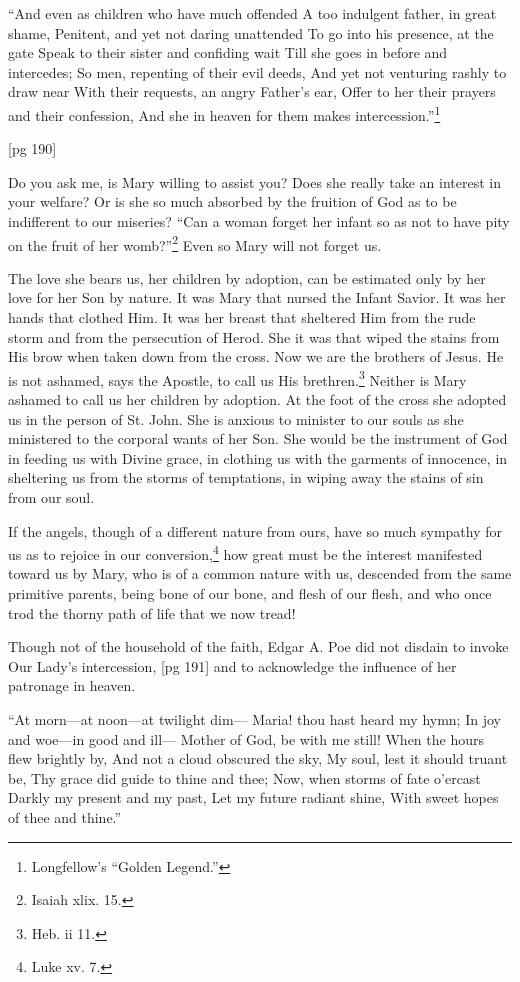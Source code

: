 “And even as children who have much offended
A too indulgent father, in great shame,
Penitent, and yet not daring unattended
To go into his presence, at the gate
Speak to their sister and confiding wait
Till she goes in before and intercedes;
So men, repenting of their evil deeds,
And yet not venturing rashly to draw near
With their requests, an angry Father's ear,
Offer to her their prayers and their confession,
And she in heaven for them makes
intercession.”\footnote{Longfellow's “Golden Legend.”}

[pg 190]

Do you ask me, is Mary willing to assist you?
Does she really take an interest in your welfare?
Or is she so much absorbed by the fruition of God
as to be indifferent to our miseries? “Can a woman
forget her infant so as not to have pity on the fruit
of her womb?”\footnote{Isaiah xlix.
15.} Even so Mary will not forget us.

The love she bears us, her children by adoption,
can be estimated only by her love for her
Son by nature. It was Mary that nursed the Infant
Savior. It was her hands that clothed Him.
It was her breast that sheltered Him from the
rude storm and from the persecution of Herod.
She it was that wiped the stains from His brow
when taken down from the cross. Now we are the
brothers of Jesus. He is not ashamed, says the
Apostle, to call us His brethren.\footnote{Heb.
ii 11.} Neither is Mary
ashamed to call us her children by adoption. At
the foot of the cross she adopted us in the person
of St. John. She is anxious to minister to
our souls as she ministered to the corporal wants
of her Son. She would be the instrument of God
in feeding us with Divine grace, in clothing us
with the garments of innocence, in sheltering us
from the storms of temptations, in wiping away
the stains of sin from our soul.

If the angels, though of a different nature from
ours, have so much sympathy for us as to rejoice
in our conversion,\footnote{Luke xv.
7.} how great must be the interest
manifested toward us by Mary, who is of a
common nature with us, descended from the same
primitive parents, being bone of our bone, and
flesh of our flesh, and who once trod the thorny
path of life that we now tread!

Though not of the household of the faith, Edgar
A. Poe did not disdain to invoke Our Lady's intercession,
[pg 191]
and to acknowledge the influence of
her patronage in heaven.

“At morn—at noon—at twilight dim—
Maria! thou hast heard my hymn;
In joy and woe—in good and ill—
Mother of God, be with me still!
When the hours flew brightly by,
And not a cloud obscured the sky,
My soul, lest it should truant be,
Thy grace did guide to thine and thee;
Now, when storms of fate o'ercast
Darkly my present and my past,
Let my future radiant shine,
With sweet hopes of thee and thine.”


